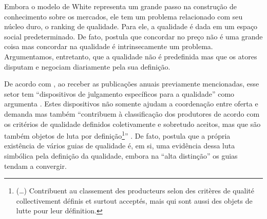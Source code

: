 \documentclass[a4paper, 12pt, openright, oneside, german, french, english, brazil]{abntex2}
\begin{document}
	
	Embora o modelo de White representa um grande passo na construção de conhecimento sobre os mercados, ele tem um problema relacionado com seu núcleo duro, o ranking de qualidade. Para ele, a qualidade é dada em um espaço social predeterminado. De fato,  postula que concordar no preço não é uma grande coisa mas concordar na qualidade é intrinsecamente um problema. Argumentamos, entretanto, que a qualidade não é predefinida mas que os atores disputam e negociam diariamente pela sua definição.
	
	
	De acordo com , ao receber as publicações anuais previamente mencionadas, esse setor tem ``dispositivos de julgamento específicos para a qualidade'' como argumenta . Estes dispositivos não somente ajudam a coordenação entre oferta e demanda mas também ``contribuem à classificação dos produtores de acordo com os critérios de qualidade definidos coletivamente e sobretudo aceitos, mas que são também objetos de luta por definição\footnote{(\dots) Contribuent au classement des producteurs selon des critères de qualité collectivement définis et surtout acceptés, mais qui sont aussi des objets de lutte pour leur définition.}'' \cite[p. 494]{eloire2009reseaux}. De fato,  postula que a própria existência de vários guias de qualidade é, em si, uma evidência dessa luta simbólica pela definição da qualidade, embora na ``alta distinção'' os guias tendam a convergir.
	
\end{document}
